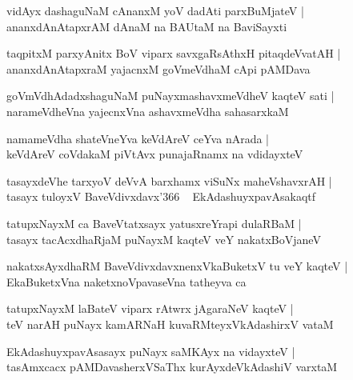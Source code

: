 \documentclass[twoside,12pt,openright]{book}
\newcounter{shloka}[chapter]
\begin{document}
\begin{shloka}%
vidAyx dashaguNaM cAnanxM yoV dadAti parxBuMjateV |\\
ananxdAnAtapxrAM dAnaM na BAUtaM na BaviSayxti
\end{shloka}

\begin{shloka}%
taqpitxM parxyAnitx BoV viparx savxgaRsAthxH pitaqdeVvatAH |\\
ananxdAnAtapxraM yajacnxM goVmeVdhaM cApi pAMDava 
\end{shloka}

\begin{shloka}%
goVmVdhAdadxshaguNaM puNayxmashavxmeVdheV kaqteV sati |\\
narameVdheVna yajecnxVna ashavxmeVdha sahasarxkaM 
\end{shloka}

\begin{shloka}%
namameVdha shateVneYva keVdAreV ceYva nArada |\\
keVdAreV coVdakaM piVtAvx punajaRnamx na vdidayxteV 
\end{shloka}

\begin{shloka}%
tasayxdeVhe tarxyoV deVvA barxhamx viSuNx maheVshavxrAH |\\
tasayx tuloyxV BaveVdivxdavx\char'366 ~ EkAdashuyxpavAsakaqtf
\end{shloka}

\begin{shloka}%
tatupxNayxM ca BaveVtatxsayx yatusxreYrapi dulaRBaM |\\
tasayx tacAcxdhaRjaM puNayxM kaqteV veY nakatxBoVjaneV 
\end{shloka}

\begin{shloka}%
nakatxsAyxdhaRM BaveVdivxdavxnenxVkaBuketxV tu veY kaqteV |\\
EkaBuketxVna naketxnoVpavaseVna tatheyva ca 
\end{shloka}

\begin{shloka}%
tatupxNayxM laBateV viparx rAtwrx jAgaraNeV kaqteV |\\
teV narAH puNayx kamARNaH kuvaRMteyxVkAdashirxV vataM 
\end{shloka}

\begin{shloka}%
EkAdashuyxpavAsasayx puNayx saMKAyx na vidayxteV |\\
tasAmxcacx pAMDavasherxVSaThx kurAyxdeVkAdashiV varxtaM 
\end{shloka}
\end{document}
